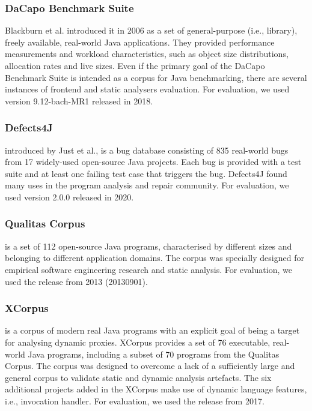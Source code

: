 \subsubsection*{\textbf{DaCapo Benchmark Suite}}Blackburn et al. introduced it in 2006 as a set of general-purpose (i.e., library), freely available, real-world Java applications. They provided performance measurements and workload characteristics, such as object size distributions, allocation rates and live sizes. Even if the primary goal of the
DaCapo Benchmark Suite is intended as a corpus for Java benchmarking, there are
several instances of frontend and static analysers evaluation.
For evaluation, we used version 9.12-bach-MR1 released in 2018.

\subsubsection*{\textbf{Defects4J}}
introduced by Just et al., is a bug database consisting of 835 real-world bugs from 17 widely-used open-source Java projects.
Each bug is provided with a test suite and at least one failing test case that triggers the bug.
Defects4J found many uses in the program analysis and repair community.
For evaluation, we used version 2.0.0 released in 2020.

\subsubsection*{\textbf{Qualitas Corpus}}
 is  a set of 112 open-source Java programs, characterised by different sizes and belonging to different
application domains.  The corpus was specially designed for empirical software engineering research and static analysis.
For evaluation, we used the release from 2013 (20130901).

\subsubsection*{\textbf{XCorpus}}
is a corpus of modern real Java programs with an explicit goal of being a target for analysing dynamic proxies. XCorpus provides a set of 76 executable, real-world Java programs, including a subset of 70 programs from the Qualitas Corpus. The corpus was designed
to overcome a lack of a sufficiently large and general corpus to validate static and dynamic analysis artefacts. The six additional projects added in the XCorpus make use of dynamic language features, i.e., invocation handler.
For evaluation, we used the release from 2017.



